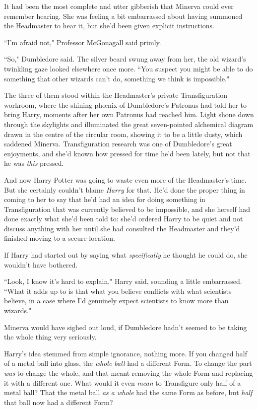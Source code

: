 It had been the most complete and utter gibberish that Minerva could ever remember hearing. She was feeling a bit embarrassed about having summoned the Headmaster to hear it, but she'd been given explicit instructions.

``I'm afraid not," Professor McGonagall said primly.

``So," Dumbledore said. The silver beard swung away from her, the old wizard's twinkling gaze looked elsewhere once more. ``You suspect you might be able to do something that other wizards can't do, something we think is impossible."

The three of them stood within the Headmaster's private Transfiguration workroom, where the shining phœnix of Dumbledore's Patronus had told her to bring Harry, moments after her own Patronus had reached him. Light shone down through the skylights and illuminated the great seven-pointed alchemical diagram drawn in the centre of the circular room, showing it to be a little dusty, which saddened Minerva. Transfiguration research was one of Dumbledore's great enjoyments, and she'd known how pressed for time he'd been lately, but not that he was \emph{this} pressed.

And now Harry Potter was going to waste even more of the Headmaster's time. But she certainly couldn't blame \emph{Harry} for that. He'd done the proper thing in coming to her to say that he'd had an idea for doing something in Transfiguration that was currently believed to be impossible, and she herself had done exactly what she'd been told to: she'd ordered Harry to be quiet and not discuss anything with her until she had consulted the Headmaster and they'd finished moving to a secure location.

If Harry had started out by saying what \emph{specifically} he thought he could do, she wouldn't have bothered.

``Look, I know it's hard to explain," Harry said, sounding a little embarrassed. ``What it adds up to is that what you believe conflicts with what scientists believe, in a case where I'd genuinely expect scientists to know more than wizards."

Minerva would have sighed out loud, if Dumbledore hadn't seemed to be taking the whole thing very seriously.

Harry's idea stemmed from simple ignorance, nothing more. If you changed half of a metal ball into glass, the \emph{whole ball} had a different Form. To change the part \emph{was} to change the whole, and that meant removing the whole Form and replacing it with a different one. What would it even \emph{mean} to Transfigure only half of a metal ball? That the metal ball \emph{as a whole} had the same Form as before, but \emph{half} that ball now had a different Form?

